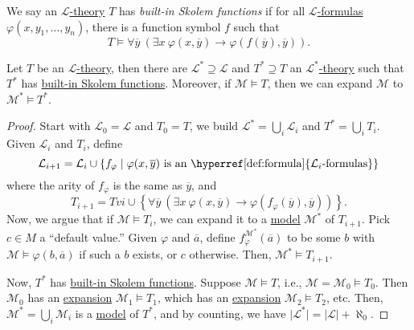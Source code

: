 \begin{definition}\label{def:built-in-Skolem-function}
	We say an \hyperref[def:theory]{\(\mathcal{L} \)-theory} \(T\) has \emph{built-in Skolem functions} if for all \hyperref[def:formula]{\(\mathcal{L} \)-formulas} \(\varphi (x, y_1, \ldots , y_n)\), there is a function symbol \(f\) such that
	\[
		T\models \forall \overline{y} \ (\exists x\ \varphi (x, \overline{y} ) \to \varphi (f(\overline{y} ), \overline{y} )).
	\]
\end{definition}

\begin{lemma}\label{lma:Skolemization}
	Let \(T\) be an \hyperref[def:theory]{\(\mathcal{L} \)-theory}, then there are \(\mathcal{L} ^{\ast} \supseteq \mathcal{L} \) and \(T^{\ast} \supseteq T\) an \hyperref[def:theory]{\(\mathcal{L} ^{\ast} \)-theory} such that \(T^{\ast} \) has \hyperref[def:built-in-Skolem-function]{built-in Skolem functions}. Moreover, if \(\mathcal{M} \models T\), then we can expand \(\mathcal{M} \) to \(\mathcal{M} ^{\ast} \models T^{\ast} \).
\end{lemma}
\begin{proof}
	Start with \(\mathcal{L} _0 = \mathcal{L} \) and \(T_0 = T\), we build \(\mathcal{L} ^{\ast} = \bigcup_{i} \mathcal{L} _i\) and \(T^{\ast} = \bigcup_{i} T_i\). Given \(\mathcal{L} _i\) and \(T_i\), define
	\[
		\mathcal{L} _{i+1} = \mathcal{L} _i \cup \left\{ f_\varphi \mid \varphi (x, \overline{y} ) \text{ is an \hyperref[def:formula]{\(\mathcal{L} _i \)-formulas}} \right\}
	\]
	where the arity of \(f_\varphi \) is the same as \(\overline{y} \), and
	\[
		T_{i+1} = Tvi \cup \left\{ \forall \overline{y} \ (\exists x\ \varphi (x, \overline{y} ) \to \varphi (f_\varphi (\overline{y} ) , \overline{y} ) ) \right\}.
	\]
	Now, we argue that if \(\mathcal{M} \models T_i\), we can expand it to a \hyperref[def:model]{model} \(\mathcal{M} ^{\ast} \) of \(T_{i+1} \). Pick \(c\in M\) a ``default value.'' Given \(\varphi \) and \(\overline{a} \), define \(f_\varphi ^{\mathcal{M} ^{\ast} }(\overline{a} )\) to be some \(b\) with \(\mathcal{M} \models \varphi (b, \overline{a} )\) if such a \(b\) exists, or \(c\) otherwise. Then, \(\mathcal{M} ^{\ast} \models T_{i+1} \).

	Now, \(T^{\ast} \) has \hyperref[def:built-in-Skolem-function]{built-in Skolem functions}. Suppose \(\mathcal{M} \models T\), i.e., \(\mathcal{M} = \mathcal{M} _0 \models T_0\). Then \(\mathcal{M} _0\) has an \hyperref[not:expansion]{expansion} \(\mathcal{M} _1 \models T_1\), which has an \hyperref[not:expansion]{expansion} \(\mathcal{M} _2 \models T_2\), etc. Then, \(\mathcal{M} ^{\ast} = \bigcup_{i} \mathcal{M} _i\) is a \hyperref[def:model]{model} of \(T^{\ast} \), and by counting, we have \(\vert \mathcal{L} ^{\ast} \vert = \vert \mathcal{L} \vert + \aleph_0\).
\end{proof}

